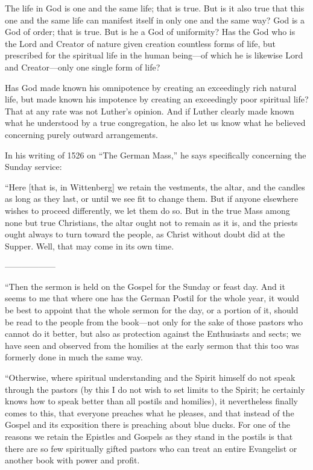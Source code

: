The life in God is one and the same life; that is true. But is it also true that this one and the same life can manifest itself in only one and the same way? God is a God of order; that is true. But is he a God of uniformity? Has the God who is the Lord and Creator of nature given creation countless forms of life, but prescribed for the spiritual life in the human being—of which he is likewise Lord and Creator—only one single form of life?

Has God made known his omnipotence by creating an exceedingly rich natural life, but made known his impotence by creating an exceedingly poor spiritual life? That at any rate was not Luther’s opinion. And if Luther clearly made known what he understood by a true congregation, he also let us know what he believed concerning purely outward arrangements.

In his writing of 1526 on “The German Mass,” he says specifically concerning the Sunday service:

“Here [that is, in Wittenberg] we retain the vestments, the altar, and the candles as long as they last, or until we see fit to change them. But if anyone elsewhere wishes to proceed differently, we let them do so. But in the true Mass among none but true Christians, the altar ought not to remain as it is, and the priests ought always to turn toward the people, as Christ without doubt did at the Supper. Well, that may come in its own time.

——————

“Then the sermon is held on the Gospel for the Sunday or feast day. And it seems to me that where one has the German Postil for the whole year, it would be best to appoint that the whole sermon for the day, or a portion of it, should be read to the people from the book—not only for the sake of those pastors who cannot do it better, but also as protection against the Enthusiasts and sects; we have seen and observed from the homilies at the early sermon that this too was formerly done in much the same way.

“Otherwise, where spiritual understanding and the Spirit himself do not speak through the pastors (by this I do not wish to set limits to the Spirit; he certainly knows how to speak better than all postils and homilies), it nevertheless finally comes to this, that everyone preaches what he pleases, and that instead of the Gospel and its exposition there is preaching about blue ducks. For one of the reasons we retain the Epistles and Gospels as they stand in the postils is that there are so few spiritually gifted pastors who can treat an entire Evangelist or another book with power and profit.

